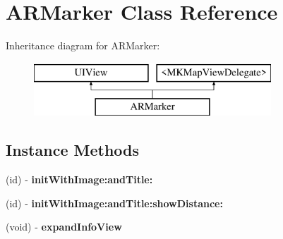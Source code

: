 \hypertarget{interface_a_r_marker}{\section{A\-R\-Marker Class Reference}
\label{interface_a_r_marker}
}
Inheritance diagram for A\-R\-Marker\-:\begin{figure}[H]
\begin{center}
\leavevmode
\includegraphics[height=2.000000cm]{interface_a_r_marker}
\end{center}
\end{figure}
\subsection*{Instance Methods}
\begin{DoxyCompactItemize}
\item 
\hypertarget{interface_a_r_marker_aefdf5cd792cf368d091ec487ea75fb07}{(id) -\/ {\bfseries init\-With\-Image\-:and\-Title\-:}}\label{interface_a_r_marker_aefdf5cd792cf368d091ec487ea75fb07}

\item 
\hypertarget{interface_a_r_marker_a00ea35be943b1da740df3d3764453fff}{(id) -\/ {\bfseries init\-With\-Image\-:and\-Title\-:show\-Distance\-:}}\label{interface_a_r_marker_a00ea35be943b1da740df3d3764453fff}

\item 
\hypertarget{interface_a_r_marker_ad49f824d18c33ad3f3112ea138b0df2c}{(void) -\/ {\bfseries expand\-Info\-View}}\label{interface_a_r_marker_ad49f824d18c33ad3f3112ea138b0df2c}

\end{DoxyCompactItemize}
